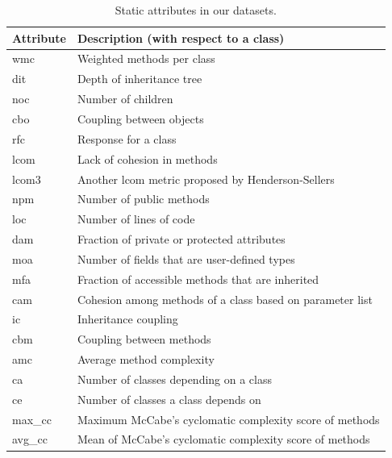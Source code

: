 \documentclass[10pt,compsoc,twocolumn]{IEEEtran}
\begin{document}
\begin{table}
    \centering
    \caption{Static attributes in our  datasets.}
    \begin{tabularx}{\linewidth}{lL}
    \toprule
        Attribute   & Description (with respect to a class) \\
        \midrule
        wmc & Weighted methods per class \cite{chidamber1994metrics} \\
        dit & Depth of inheritance tree \cite{chidamber1994metrics} \\
        noc & Number of children \cite{chidamber1994metrics} \\
        cbo & Coupling between objects \cite{chidamber1994metrics} \\
        rfc & Response for a class \cite{chidamber1994metrics} \\
        lcom & Lack of cohesion in methods \cite{chidamber1994metrics} \\
        lcom3 & Another lcom metric proposed by Henderson-Sellers \cite{henderson1996coupling} \\
        npm & Number of public methods \cite{bansiya2002hierarchical} \\
        loc & Number of lines of code \cite{bansiya2002hierarchical} \\
        dam & Fraction of private or protected attributes \cite{bansiya2002hierarchical} \\
        moa & Number of fields that are user-defined types \cite{bansiya2002hierarchical} \\
     mfa & Fraction of accessible methods that are inherited \cite{bansiya2002hierarchical} \\
        cam & Cohesion among methods of a class based on parameter list \cite{bansiya2002hierarchical} \\
     ic & Inheritance coupling \cite{tang1999empirical} \\
        cbm & Coupling between methods \cite{tang1999empirical} \\
     amc & Average method complexity \cite{tang1999empirical} \\
        ca & Number of classes depending on a class \cite{tang1999empirical} \\
     ce & Number of classes a class depends on \cite{tang1999empirical} \\
        max\_cc & Maximum McCabe's cyclomatic complexity score of methods \cite{mccabe1976complexity} \\
     avg\_cc & Mean of McCabe's cyclomatic complexity score of methods \cite{mccabe1976complexity} 
    \end{tabularx}
    \label{tab:attributes}
\end{table}
\end{document}
